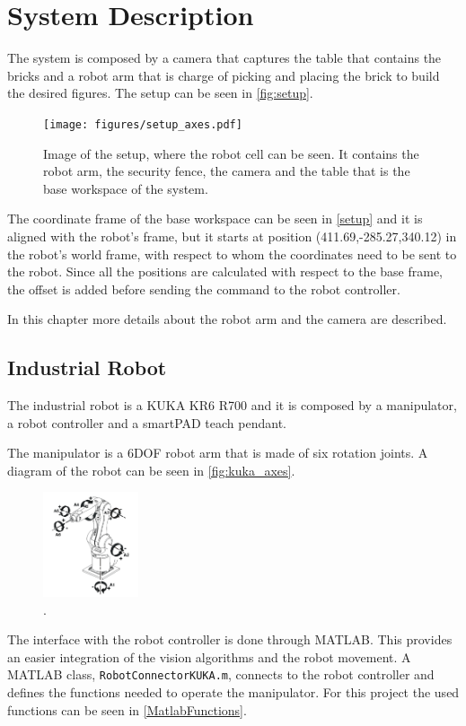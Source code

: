 \chapter{System Description}\label{chap:systemDescription}
The system is composed by a camera that captures the table that contains the bricks and a robot arm that is charge of picking and placing the brick to build the desired figures. The setup can be seen in \autoref{fig:setup}.
\begin{figure}[H]
    \texttt{[image: figures/setup\_axes.pdf]}
    \caption{Image of the setup, where the robot cell can be seen. It contains the robot arm, the security fence, the camera and the table that is the base workspace of the system. }
    \label{fig:setup}
\end{figure}

The coordinate frame of the base workspace can be seen in \autoref{setup} and it is aligned with the robot's frame, but it starts at position (411.69,-285.27,340.12) in the robot's world frame, with respect to whom the coordinates need to be sent to the robot. Since all the positions are calculated with respect to the base frame, the offset is added before sending the command to the robot controller.
  
In this chapter more details about the robot arm and the camera are described. 

\section{Industrial Robot}
The industrial robot is a KUKA KR6 R700 and it is composed by a manipulator, a robot controller and a smartPAD teach pendant. 

The manipulator is a 6DOF robot arm that is made of six rotation joints. A diagram of the robot can be seen in \autoref{fig:kuka_axes}.
\begin{figure}[H]
    \includegraphics[width=0.25\textwidth]{figures/kuka_axes.png}
    \caption{.\cite{kuka} }
    \label{fig:kuka_axes}
\end{figure}

The interface with the robot controller is done through MATLAB. This provides an easier integration of the vision algorithms and the robot movement. A MATLAB class, \lstinline[style=matlabinline]{RobotConnectorKUKA.m}, connects to the robot controller and defines the functions needed to operate the manipulator. For this project the used functions can be seen in \autoref{MatlabFunctions}.

